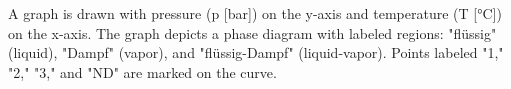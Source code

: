 A graph is drawn with pressure (p [bar]) on the y-axis and temperature (T [°C]) on the x-axis. The graph depicts a phase diagram with labeled regions: "flüssig" (liquid), "Dampf" (vapor), and "flüssig-Dampf" (liquid-vapor). Points labeled "1," "2," "3," and "ND" are marked on the curve.